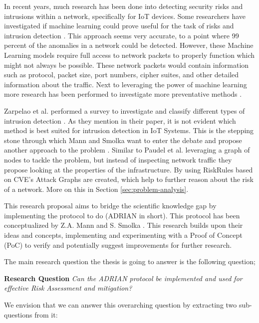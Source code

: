 In recent years, much research has been done into detecting security risks and intrusions within a network, specifically for IoT devices. Some researchers have investigated if machine learning could prove useful for the task of risks and intrusion detection \cite{canedo2016using, doshi2018machine, hamza2019detecting, sivanathan2018classifying}. This approach seems very accurate, to a point where 99 percent of the anomalies in a network could be detected. However, these Machine Learning models require full access to network packets to properly function which might not always be possible. These network packets would contain information such as protocol, packet size, port numbers, cipher suites, and other detailed information about the traffic. Next to leveraging the power of machine learning more research has been performed to investigate more preventative methods \cite{miettinen2017iot, hamza2019detecting, paudel2019detecting}.

Zarpelao et al. performed a survey to investigate and classify different types of intrusion detection \cite{zarpelao2017survey}. As they mention in their paper, it is not evident which method is best suited for intrusion detection in IoT Systems. This is the stepping stone through which Mann and Smolka want to enter the debate and propose another approach to the problem \cite{mann2023ADRIAN}. Similar to Paudel et al. leveraging a graph of nodes to tackle the problem, but instead of inspecting network traffic they propose looking at the properties of the infrastructure. By using RiskRules based on CVE's Attack Graphs are created, which help to further reason about the risk of a network. More on this in Section \ref{sec:problem-analysis}.

This research proposal aims to bridge the scientific knowledge gap by implementing the protocol to do \ADRIAN (ADRIAN in short). This protocol has been conceptualized by Z.A. Mann and S. Smolka \cite{mann2023ADRIAN}. This research builds upon their ideas and concepts, implementing and experimenting with a Proof of Concept (PoC) to verify and potentially suggest improvements for further research. 
 
\vspace{1em}
The main research question the thesis is going to answer is the following question;

\textbf{Research Question}\label{rq} \emph{Can the ADRIAN protocol be implemented and used for effective Risk Assessment and mitigation?}\vspace{1em}

We envision that we can answer this overarching question by extracting two sub-questions from it:



